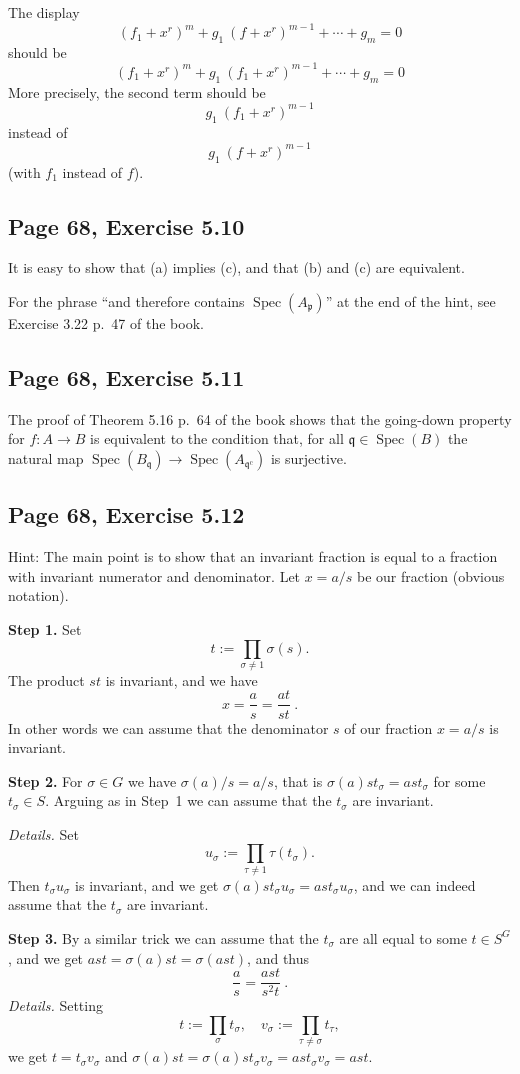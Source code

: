 \documentclass[parskip=half,fontsize=12pt]{scrartcl}%
\newcommand{\oo}{\operatorname}\newcommand{\ooo}{\operatorname*}
\newcommand{\mf}{\mathfrak}
\newcommand{\ppp}{\mf p}
\newcommand{\qqq}{\mf q}
\newcommand{\Spec}{\operatorname{Spec}}\newcommand{\Sp}{\operatorname{Spec}}
\begin{document}
The display 
$$
(f_1+x^r)^m+g_1\ (f+x^r)^{m-1}+\cdots+g_m=0
$$ 
should be 
$$
(f_1+x^r)^m+g_1\ (f_1+x^r)^{m-1}+\cdots+g_m=0
$$ 
More precisely, the second term should be $$g_1\ (f_1+x^r)^{m-1}$$ instead of $$g_1\ (f+x^r)^{m-1}$$ (with $f_1$ instead of $f$).

\subsection{Page 68, Exercise 5.10}%

It is easy to show that (a) implies (c), and that (b) and (c) are equivalent.

For the phrase ``and therefore contains $\Spec(A_\ppp)$'' at the end of the hint, see Exercise 3.22 p.~47 of the book.

\subsection{Page 68, Exercise 5.11}%

The proof of Theorem 5.16 p.~64 of the book shows that the going-down property for $f:A\to B$ is equivalent to the condition that, for all $\qqq\in\Spec(B)$ the natural map $\Spec(B_\qqq)\to\Spec(A_{\qqq^{\oo c}})$ is surjective. 

\subsection{Page 68, Exercise 5.12}%

Hint: The main point is to show that an invariant fraction is equal to a fraction with invariant numerator and denominator. Let $x=a/s$ be our fraction (obvious notation). 

\textbf{Step 1.} Set 
$$
t:=\prod_{\sigma\ne1}\sigma(s).
$$ 
The product $st$ is invariant, and we have 
$$
x=\frac{a}{s}=\frac{at}{st}\ .
$$ 
In other words we can assume that the denominator $s$ of our fraction $x=a/s$ is invariant.

\textbf{Step 2.} For $\sigma\in G$ we have $\sigma(a)/s=a/s$, that is $\sigma(a)st_\sigma=ast_\sigma$ for some $t_\sigma\in S$. Arguing as in Step~1 we can assume that the $t_\sigma$ are invariant. 

\emph{Details.} Set 
$$
u_\sigma:=\prod_{\tau\ne1}\tau(t_\sigma).
$$ 
Then $t_\sigma u_\sigma$ is invariant, and we get $\sigma(a)st_\sigma u_\sigma=ast_\sigma u_\sigma$, and we can indeed assume that the $t_\sigma$ are invariant.

\textbf{Step 3.} By a similar trick we can assume that the $t_\sigma$ are all equal to some $t\in S^G$, and we get $ast=\sigma(a)st=\sigma(ast)$, and thus 
$$
\frac{a}{s}=\frac{ast}{s^2t}\ .
$$ 
\emph{Details.} Setting 
$$
t:=\prod_\sigma t_\sigma,\quad v_\sigma:=\prod_{\tau\ne\sigma}t_\tau,
$$ 
we get $t=t_\sigma v_\sigma$ and $\sigma(a)st=\sigma(a)st_\sigma v_\sigma=ast_\sigma v_\sigma=ast$.
\end{document}
